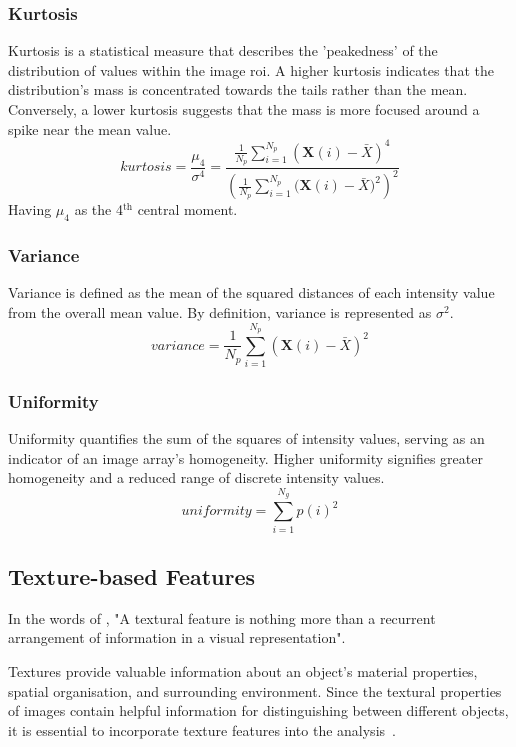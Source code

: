 \subsubsection*{Kurtosis}
Kurtosis is a statistical measure that describes the 'peakedness' of the distribution of values within the image \ac{roi}. A higher kurtosis indicates that the distribution's mass is concentrated towards the tails rather than the mean. Conversely, a lower kurtosis suggests that the mass is more focused around a spike near the mean value.
\begin{equation}
    \textit{kurtosis} = \displaystyle\frac{\mu_4}{\sigma^4} =
        \frac{\frac{1}{N_p}\sum^{N_p}_{i=1}{(\textbf{X}(i)-\bar{X})^4}}
        {\left(\frac{1}{N_p}\sum^{N_p}_{i=1}{(\textbf{X}(i)-\bar{X}})^2\right)^2}
\end{equation}
Having $\mu_4$ as the 4$^{\text{th}}$ central moment.
\subsubsection*{Variance}
Variance is defined as the mean of the squared distances of each intensity value from the overall mean value. By definition, variance is represented as $\sigma^2$.
\begin{equation}
    \textit{variance} = \frac{1}{N_p}\displaystyle\sum^{N_p}_{i=1}{(\textbf{X}(i)-\bar{X})^2}
\end{equation}

\subsubsection*{Uniformity}
Uniformity quantifies the sum of the squares of intensity values, serving as an indicator of an image array's homogeneity. Higher uniformity signifies greater homogeneity and a reduced range of discrete intensity values.
\begin{equation}
    \textit{uniformity} = \displaystyle\sum^{N_g}_{i=1}{p(i)^2}
\end{equation}


\subsection{Texture-based Features}
In the words of \textcite{kaur_review_2021}, "A textural feature is nothing more than a recurrent arrangement of information in a visual representation". 

Textures provide valuable information about an object's material properties, spatial organisation, and surrounding environment.
Since the textural properties of images contain helpful information for distinguishing between different objects, it is essential to incorporate texture features into the analysis~\cite{haralick_textural_1973}.

